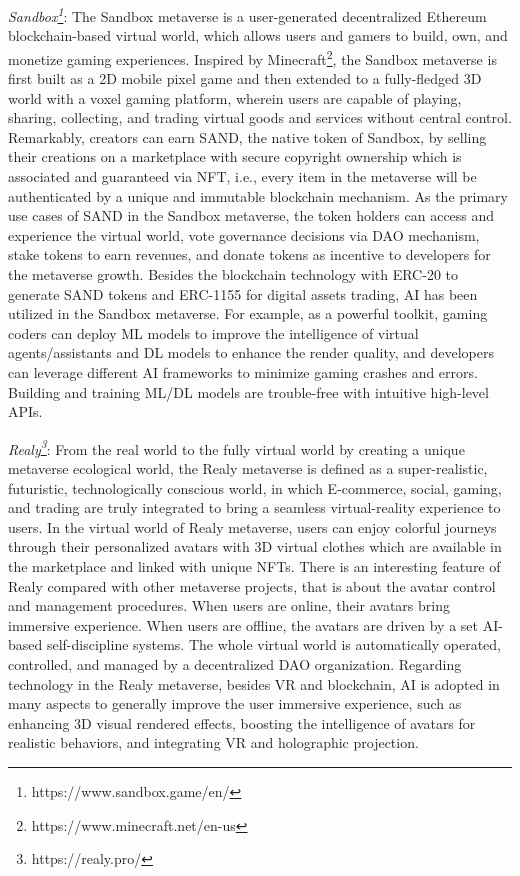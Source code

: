 \documentclass[journal]{IEEEtran}
\begin{document}
\textit{Sandbox\footnote{https://www.sandbox.game/en/}}: 
The Sandbox metaverse is a user-generated decentralized Ethereum blockchain-based virtual world, which allows users and gamers to build, own, and monetize gaming experiences. 
Inspired by Minecraft\footnote{https://www.minecraft.net/en-us}, the Sandbox metaverse is first built as a 2D mobile pixel game and then extended to a fully-fledged 3D world with a voxel gaming platform, wherein users are capable of playing, sharing, collecting, and trading virtual goods and services without central control. Remarkably, creators can earn SAND, the native token of Sandbox, by selling their creations on a marketplace with secure copyright ownership which is associated and guaranteed via NFT, i.e., every item in the metaverse will be authenticated by a unique and immutable blockchain mechanism.
As the primary use cases of SAND in the Sandbox metaverse, the token holders can access and experience the virtual world, vote governance decisions via DAO mechanism, stake tokens to earn revenues, and donate tokens as incentive to developers for the metaverse growth.
Besides the blockchain technology with ERC-20 to generate SAND tokens and ERC-1155 for digital assets trading, AI has been utilized in the Sandbox metaverse. For example, as a powerful toolkit, gaming coders can deploy ML models to improve the intelligence of virtual agents/assistants and DL models to enhance the render quality, and developers can leverage different AI frameworks to minimize gaming crashes and errors. Building and training ML/DL models are trouble-free with intuitive high-level APIs. 

\textit{Realy\footnote{https://realy.pro/}}: 
From the real world to the fully virtual world by creating a unique metaverse ecological world, the Realy metaverse is defined as a super-realistic, futuristic, technologically conscious world, in which E-commerce, social, gaming, and trading are truly integrated to bring a seamless virtual-reality experience to users. In the virtual world of Realy metaverse, users can enjoy colorful journeys through their personalized avatars with 3D virtual clothes which are available in the marketplace and linked with unique NFTs. 
There is an interesting feature of Realy compared with other metaverse projects, that is about the avatar control and management procedures. When users are online, their avatars bring immersive experience. When users are offline, the avatars are driven by a set AI-based self-discipline systems. The whole virtual world is automatically operated, controlled, and managed by a decentralized DAO organization. 
Regarding technology in the Realy metaverse, besides VR and blockchain, AI is adopted in many aspects to generally improve the user immersive experience, such as enhancing 3D visual rendered effects, boosting the intelligence of avatars for realistic behaviors, and integrating VR and holographic projection. 
\end{document}

